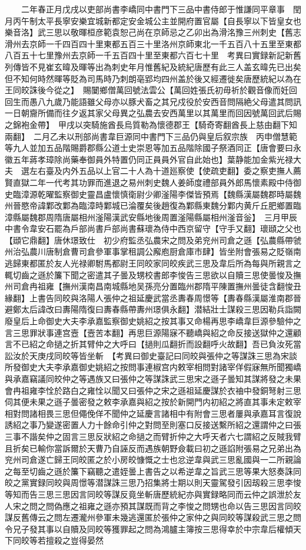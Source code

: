 　　二年春正月戊戌以吏部尚書李嶠同中書門下三品中書侍郎于惟謙同平章事　閏月丙午制太平長寧安樂宜城新都定安金城公主並開府置官屬【自長寧以下皆皇女也樂音洛】武三思以敬暉桓彦範袁恕己尚在京師忌之乙卯出為滑洺豫三州刺史【舊志滑州去京師一千四百四十里東都五百三十里洛州京師東北一千五百八十五里至東都八百五十七里豫州去京師一千五百四十里至東都六百七十里　考異曰實録新記新舊列傳皆不見崔玄暐及暉等出為刺史年月惟舊紀及統紀唐歷有此三人盖玄暐先已出矣但不知何時然暉等貶為司馬時乃刺朗亳郢均四州盖於後又經遷徙矣唐歷統紀以為在王同皎誅後今從之】　賜䦩鄉僧萬回號法雲公【萬回姓張氏初毋祈於觀音像而妊回回生而愚八九歲乃能語雖父母亦以豚犬畜之其兄戍役於安西音問隔絶父母遣其問訊一日朝齎所備而往夕返其家父母異之弘農去安西萬里以其萬里而回因號萬回武后賜之錦袍金帶】　甲戌以突騎施酋長烏質勒為懷德郡王【騎奇寄翻酋長上慈由翻下知兩翻】　二月乙未以刑部尚書韋巨源同中書門下三品仍與皇后叙宗族　丙申僧慧範等九人並加五品階賜爵郡縣公道士史崇恩等加五品階除國子祭酒同正【唐會要曰永徽五年蔣孝璋除尚藥奉御員外特置仍同正員員外官自此始也】葉静能加金紫光禄大夫　選左右臺及内外五品以上官二十人為十道廵察使【使疏吏翻】委之察吏撫人薦賢直獄二年一代考其功罪而進退之易州刺史魏人姜師度禮部員外郎馬懷素殿中侍御史臨漳源乾曜監察御史靈昌盧懷慎衛尉少卿滏陽李傑皆預焉【魏縣漢屬魏郡時屬魏州晉愍帝諱鄴改鄴為臨漳時鄴城已淪覆矣後趙復為鄴縣東魏分鄴内黄斤丘肥鄉置臨漳縣屬魏郡周隋唐屬相州滏陽漢武安縣地後周置滏陽縣屬相州滏音釡】　三月甲辰中書令韋安石罷為戶部尚書戶部尚書蘇瓌為侍中西京留守【守手又翻】瓌頲之父也【頲它鼎翻】唐休璟致仕　初少府監丞弘農宋之問及弟兖州司倉之遜【弘農縣帶虢州治弘農川唐制倉曹司倉參軍事掌租調公廨庖厨倉庫市肆】皆坐附會張易之貶嶺南逃歸東都匿於友人光禄卿駙馬都尉王同皎家同皎疾武三思及韋后所為每與所親言之輒切齒之遜於簾下聞之密遣其子曇及甥校書郎李悛告三思欲以自贖三思使曇悛及撫州司倉冉祖雍【撫州漢南昌南城縣地吴孫亮分置臨州郡隋平陳置撫州曇徒含翻悛丑緣翻】上書告同皎與洛陽人張仲之祖延慶武當丞夀春周憬等【夀春縣漢屬淮南郡晉避鄭太后諱改曰夀陽隋復曰夀春縣帶夀州璟俱永翻】潜結壯士謀殺三思因勒兵詣闕廢皇后上命御史大夫李承嘉監察御史姚紹之按其事又命楊再思李嶠韋巨源參驗仲之言三思罪狀事連宫壼【壼苦本翻】再思巨源陽寐不聽嶠與紹之命反接送獄仲之還顧言不已紹之命撾之折其臂仲之大呼曰【撾則瓜翻折而設翻呼火故翻】吾已負汝死當訟汝於天庚戌同皎等皆坐斬　【考異曰御史臺記曰同皎與張仲之等謀誅三思為宋談所發御史大夫李承嘉御史姚紹之按問事連椒宫内敕宰相問對諸宰佯假寐無所聞獨嶠與承嘉竊議同皎仲之等遇族又曰張仲之等謀誅武三思宋之遜子曇知其謀將發之未果會冉祖雍李恮於路白之雍恮以聞又曰張仲之宋之遜祖延慶謀於衣䄂中發銅弩射三思伺其便未果之遜子曇密發之敕李承嘉與紹之按於新開門内初紹之將直其事未定敕宰相對問諸相畏三思但僶俛佯不聞仲之延慶言諸相中有附會三思者屢與承嘉耳言復說誘紹之事乃變遂密置人力十餘命引仲之對問至則塞口反接送繫所紹之還謂仲之曰張三事不諧矣仲之固言三思反狀紹之命撾之而臂折仲之大呼天者六七謂紹之反賊我臂且折矣已輸你當訴爾於天曹乃自誣反而遇族朝野僉載曰初之遜諂附張易之兄弟出為兖州司倉遂亡歸王同皎匿之於小房皎慷慨之士也忿逆韋與武三思亂國與一二所親論之每至切齒之遜於簾下竊聽之遣姪曇上書告之以希逆韋之旨武三思等果大怒奏誅同皎之黨實録同皎與周憬等潜謀誅三思乃招集將士期以則天靈駕發引因刼殺三思李悛等知而告三思三思因言同皎等謀反竟坐斬唐歷統紀亦與實録略同而云仲之誤泄於友人宋之問之問偽應之祖雍之遜亦預其謀既而背之李悛之問甥也命以告三思因言同皎謀反舊傳云之問左遷瀧州參軍未幾逃還匿於張仲之家仲之與同皎等謀殺武三思之問令兄子發其事以自贖及同皎等獲罪起之問為鴻臚主簿按三思得幸於中宗韋后權傾天下同皎等若擅殺之豈得晏然
